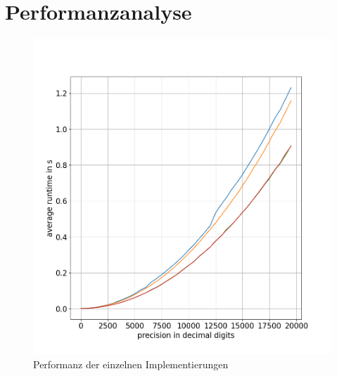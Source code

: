 \documentclass[course=erap]{aspdoc}
\begin{document}
\section{Performanzanalyse} \label{sec:performanz}
\begin{figure}[h] \centering
  \includegraphics[scale=0.25]{graphiken/performanz-diagramm.jpg}
  \caption{Performanz der einzelnen Implementierungen} \label{img:performanz-diagramm}
\end{figure} 
\end{document}
